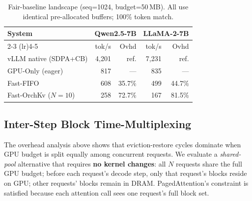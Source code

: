 \documentclass[conference]{IEEEtran}
\begin{document}
\begin{table}[t]
\centering
\caption{Fair-baseline landscape (seq=1024, budget=50\,MB). All use identical pre-allocated buffers; 100\% token match.}
\label{tab:fair-baseline}
\small
\setlength{\tabcolsep}{6pt}
\begin{tabular}{@{}lrrrr@{}}
\toprule
System & \multicolumn{2}{c}{Qwen2.5-7B} & \multicolumn{2}{c}{LLaMA-2-7B} \\
\cmidrule(lr){2-3} \cmidrule(lr){4-5}
& tok/s & Ovhd & tok/s & Ovhd \\
\midrule
vLLM native (SDPA+CB)  & 4{,}201 & ref. & 7{,}231 & ref. \\
GPU-Only (eager)        & 817 & --- & 835 & --- \\
Fast-FIFO               & 608 & 35.7\% & 499 & 44.7\% \\
Fast-OrchKv ($N{=}10$)  & 258 & 72.7\% & 167 & 81.5\% \\
\bottomrule
\end{tabular}
\end{table}

\subsection{Inter-Step Block Time-Multiplexing}
\label{sec:time-multiplex}

The overhead analysis above shows that eviction-restore cycles dominate when GPU budget is split equally among concurrent requests. We evaluate a \emph{shared-pool} alternative that requires \textbf{no kernel changes}: all $N$ requests share the full GPU budget; before each request's decode step, only that request's blocks reside on GPU; other requests' blocks remain in DRAM. PagedAttention's constraint is satisfied because each attention call sees one request's full block set.
\end{document}
